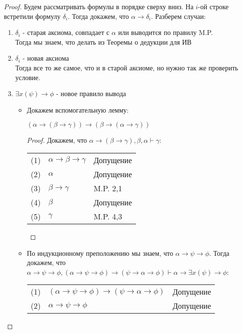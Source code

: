 \begin{proof}
Будем рассматривать формулы в порядке сверху вниз. На $i$-ой строке встретили формулу $\delta_{i}$. Тогда докажем, что $\alpha \rightarrow \delta_{i}$. Разберем случаи:
\begin{enumerate}
\item $\delta_{i}$ - старая аксиома, совпадает с $\alpha$ или выводится по правилу M.P.\\
Тогда мы знаем, что делать из Теоремы о дедукции для ИВ
\item $\delta_{i}$ - новая аксиома\\
Тогда все то же самое, что и в старой аксиоме, но нужно так же проверить условие.
\item $\exists x (\psi) \rightarrow \phi$ - новое правило вывода
\begin{itemize}
\item Докажем вспомогательную лемму:
\begin{lemma}
$(\alpha \rightarrow (\beta \rightarrow \gamma)) \rightarrow (\beta \rightarrow (\alpha \rightarrow \gamma))$
\end{lemma}
\begin{proof}
Докажем, что $\alpha \rightarrow (\beta \rightarrow \gamma), \beta, \alpha \vdash \gamma$:\\
\begin{tabular}{lll}
(1) & $\alpha \rightarrow \beta \rightarrow \gamma$& Допущение\\
(2) & $\alpha$& Допущение\\
(3) & $\beta \rightarrow \gamma$& M.P. 2,1\\
(4) & $\beta$& Допущение\\
(5) & $\gamma$& M.P. 4,3\\
\end{tabular}
\end{proof}
\item По индукционному преположению мы знаем, что $\alpha \rightarrow \psi \rightarrow \phi$. Тогда докажем, что $\alpha \rightarrow \psi \rightarrow \phi, (\alpha \rightarrow \psi \rightarrow \phi) \rightarrow (\psi \rightarrow \alpha \rightarrow \phi) \vdash \alpha \rightarrow \exists x (\psi) \rightarrow \phi$:\\
\begin{tabular}{lll}
(1) & $(\alpha \rightarrow \psi \rightarrow \phi) \rightarrow (\psi \rightarrow \alpha \rightarrow \phi)$& Допущение\\
(2) & $\alpha \rightarrow \psi \rightarrow \phi$& Допущение\\

\end{tabular}
\end{itemize}
\end{enumerate}
\end{proof}
